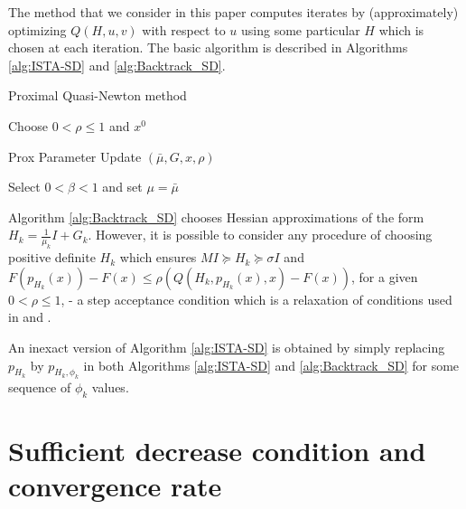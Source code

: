 \documentclass[11pt]{article}
\numberwithin{equation}{section}
\begin{document}
The method that we consider in this paper computes iterates by (approximately) optimizing $Q(H, u,v)$ with respect to $u$ using some particular  $H$  which is chosen at each iteration.
 The basic algorithm is described in Algorithms \ref{alg:ISTA-SD} and \ref{alg:Backtrack_SD}. 
\begin{algorithm2e}\caption{Proximal Quasi-Newton method}
    \label{alg:ISTA-SD}%
{\rm Choose }
$0<\rho\leq 1$ and  $x^0$\; 
\end{algorithm2e}




\begin{algorithm2e}\caption{Prox Parameter Update $(\bar \mu, G, x, \rho)$ }
    \label{alg:Backtrack_SD}%
Select $0<\beta<1$ and set $\mu=\bar \mu$\; 
\end{algorithm2e}




Algorithm \ref{alg:Backtrack_SD}  chooses Hessian approximations of the form $H_k=\frac{1}{\mu_k}I +G_k$. However, it is possible to consider any procedure of choosing positive definite $H_k$ which ensures $M I \succeq H_k\succeq \sigma I$ and 
$F(p_{H_k}(x))- F(x) \leq \rho (Q(H_k, p_{H_k}(x),x)- F(x))$, for a given $0<\rho\leq1$, - a step acceptance condition which is a relaxation of conditions used in  \cite{Beck2009} and \cite{Schmidtetal}.

An inexact version of Algorithm \ref{alg:ISTA-SD}  is obtained by simply replacing $p_{H_k}$ by $p_{H_k, \phi_k}$ in both Algorithms  \ref{alg:ISTA-SD} and \ref{alg:Backtrack_SD} for some sequence of $\phi_k$ values.  

\section{Sufficient decrease condition and convergence rate}
\label{sec:conv_exact}
\end{document}
